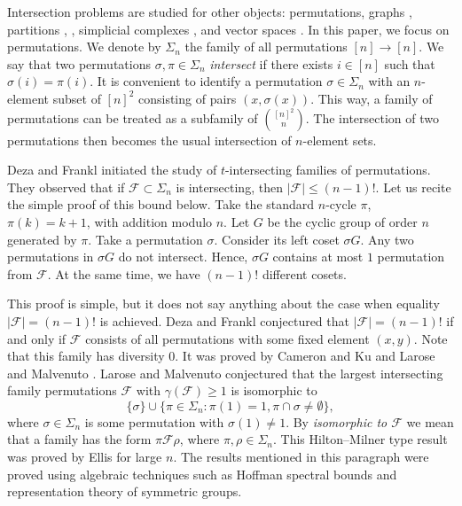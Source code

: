 \documentclass[11pt]{extarticle}
\numberwithin{equation}{section} %
\theoremstyle{plain}
\theoremstyle{definition}
\newcommand{\FF}{\mathcal{F}}
\newcommand{\m}{\mathcal}
\begin{document}
Intersection problems are studied for other objects: permutations, graphs \cite{EFF}, partitions \cite{MeMo}, \cite{Kup54}, simplicial complexes \cite{Bor3}, \cite{Kup55} and vector spaces \cite{FG}. In this paper, we focus on permutations. 
We denote by $\Sigma_n$ the family of all permutations $[n] \rightarrow [n]$. We say that two permutations $\sigma, \pi \in \Sigma_n$ \emph{intersect} if there exists $i \in [n]$ such that $\sigma(i) = \pi(i)$. It is convenient to identify a permutation $\sigma \in \Sigma_n$ with an $n$-element subset of $[n]^2$ consisting of pairs $(x, \sigma(x))$. This way, a family of permutations can be treated as a subfamily of ${[n]^2 \choose n}$. The intersection of two permutations then becomes the usual intersection of $n$-element sets.  

Deza and Frankl \cite{DeF} initiated the study of $t$-intersecting families of permutations. They observed  that if $\FF \subset \Sigma_n$ is intersecting, then $|\FF| \leq (n-1)!$. Let us recite the simple proof of this bound below. Take the standard $n$-cycle $\pi$, $\pi(k)=k+1$, with addition modulo $n$. Let $G$ be the cyclic group of order $n$ generated by $\pi$. Take a permutation $\sigma$. Consider its left coset $\sigma G$. Any two permutations in $\sigma G$ do not intersect. Hence, $\sigma G$ contains at most $1$ permutation from $\FF$. At the same time, we have $(n-1)!$ different cosets.   


This proof is simple, but it does not say anything about the case when equality $|\FF| = (n-1)!$ is achieved. Deza and Frankl conjectured that $|\FF| = (n-1)!$ if and only if $\FF$ consists of all permutations with some fixed element $(x, y)$. Note that this family has diversity $0$.  It was proved by Cameron and Ku \cite{CK} and Larose and Malvenuto \cite{LM}.  Larose and Malvenuto conjectured that the largest intersecting family permutations $\m F$ with $\gamma(\m F)\ge 1$ is isomorphic to  
\begin{equation}\label{eqhmper}\{ \sigma \} \cup \big\{\pi\in \Sigma_n: \pi(1)=1, \pi \cap \sigma\ne \emptyset\big\},\end{equation}
where $\sigma\in \Sigma_n$ is some permutation with $\sigma(1)\neq1$.  By {\it isomorphic to $\FF$} we mean that a family has the form $\pi \FF \rho$, where $\pi, \rho \in \Sigma_n$. This Hilton--Milner type result was proved by Ellis \cite{Ell} for large $n$. The results mentioned in this paragraph were proved using algebraic techniques such as Hoffman spectral bounds and representation theory of symmetric groups.
\end{document}
